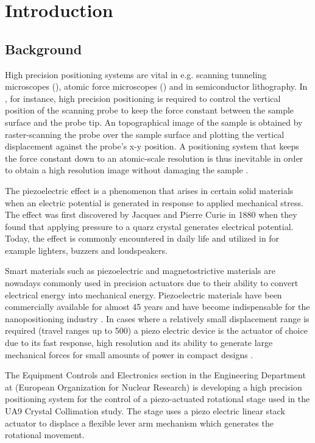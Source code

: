 \chapter{Introduction}\label{cha:intro}

\section{Background}
High precision positioning systems are vital in e.g. scanning tunneling microscopes (\abbrSTM), atomic force microscopes (\abbrAFM) and in semiconductor lithography. In \abbrAFM, for instance, high precision positioning is required to control the vertical position of the scanning probe to keep the force constant between the sample surface and the probe tip. An topographical image of the sample is obtained by raster-scanning the probe over the sample surface and plotting the vertical displacement against the probe's x-y position. A positioning system that keeps the force constant down to an atomic-scale resolution is thus inevitable in order to obtain a high resolution image without damaging the sample \citep{SurveyOfControlIssues:2007}.

The piezoelectric effect is a phenomenon that arises in certain solid materials when an electric potential is generated in response to applied mechanical stress. The effect was first discovered by Jacques and Pierre Curie in 1880 when they found that applying pressure to a quarz crystal generates electrical potential. Today, the effect is commonly encountered in daily life and utilized in for example lighters, buzzers and loudspeakers.

Smart materials such as piezoelectric and magnetostrictive materials are nowadays commonly used in precision actuators due to their ability to convert electrical energy into mechanical energy. Piezoelectric materials have been commercially available for almost 45 years and have become indispensable for the nanopositioning industry \citep{Piezo:2008}. In cases where a relatively small displacement range is required (travel ranges up to \unit{500}{\micro\meter}) a piezo electric device is the actuator of choice due to its fast response, high resolution and its ability to generate large mechanical forces for small amounts of power in compact designs \citep{SurveyOfControlIssues:2007}.

The Equipment Controls and Electronics section in the Engineering Department at \abbrCERN (European Organization for Nuclear Research) is developing a high precision positioning system for the control of a piezo-actuated rotational stage used in the UA9 Crystal Collimation study. The stage uses a piezo electric linear stack actuator to displace a flexible lever arm mechanism which generates the rotational movement.

